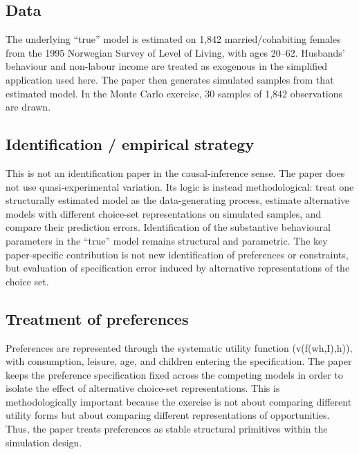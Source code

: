 \documentclass[11pt,a4paper]{article}
\begin{document}
\subsection*{Data}
The underlying “true” model is estimated on 1,842 married/cohabiting females from the 1995 Norwegian Survey of Level of Living, with ages 20–62. Husbands’ behaviour and non-labour income are treated as exogenous in the simplified application used here. The paper then generates simulated samples from that estimated model. In the Monte Carlo exercise, 30 samples of 1,842 observations are drawn.

\subsection*{Identification / empirical strategy}
This is not an identification paper in the causal-inference sense. The paper does not use quasi-experimental variation. Its logic is instead methodological: treat one structurally estimated model as the data-generating process, estimate alternative models with different choice-set representations on simulated samples, and compare their prediction errors. Identification of the substantive behavioural parameters in the “true” model remains structural and parametric. The key paper-specific contribution is not new identification of preferences or constraints, but evaluation of specification error induced by alternative representations of the choice set.

\subsection*{Treatment of preferences}
Preferences are represented through the systematic utility function (v(f(wh,I),h)), with consumption, leisure, age, and children entering the specification. The paper keeps the preference specification fixed across the competing models in order to isolate the effect of alternative choice-set representations. This is methodologically important because the exercise is not about comparing different utility forms but about comparing different representations of opportunities. Thus, the paper treats preferences as stable structural primitives within the simulation design.
\end{document}
